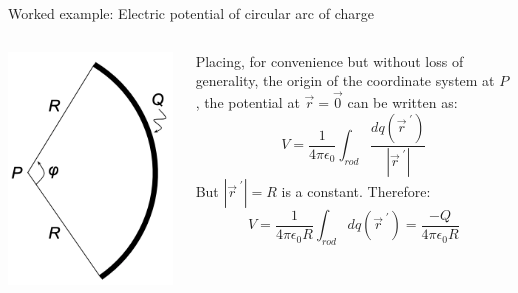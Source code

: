 {\begin{frame}{Worked example: Electric potential of circular arc of charge}
\begin{columns}
  \begin{column}{0.25\textwidth}
   \begin{center}
     \includegraphics[width=0.99\textwidth]{./images/problems/lect03_potential_arc}
   \end{center}
  \end{column}
  \begin{column}{0.70\textwidth}
    Placing, for convenience but without loss of generality, the origin of the
    coordinate system at $P$, the potential at $\vec{r}=\vec{0}$ can be written as:
    \begin{equation*}
       V = \frac{1}{4\pi\epsilon_0}
         \int_{rod} \frac{dq(\vec{r}^{\;\prime})}{|\vec{r}^{\;\prime}|}
    \end{equation*}
    But $|\vec{r}^{\;\prime}|=R$ is a constant. Therefore:
    \begin{equation*}
       V = \frac{1}{4\pi\epsilon_0 R}
         \int_{rod} dq(\vec{r}^{\;\prime}) =
         \frac{-Q}{4\pi\epsilon_0 R}
    \end{equation*}
  \end{column}
\end{columns}

\end{frame}

} %

